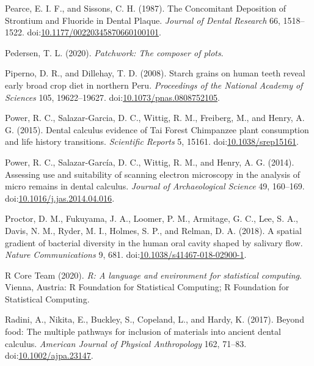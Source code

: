 \documentclass[utf8]{frontiers/frontiersSCNS}
\newlength{\cslhangindent}
\newlength{\cslentryspacingunit} %
\newenvironment{CSLReferences}[2] %
 {%
  \setlength{\parindent}{0pt}
  \ifodd #1
  \let\oldpar\par
  \def\par{\hangindent=\cslhangindent\oldpar}
  \fi
  \setlength{\parskip}{#2\cslentryspacingunit}
 }%
 {}
\begin{document}
\begin{CSLReferences}{1}{0}
\leavevmode{}%
Pearce, E. I. F., and Sissons, C. H. (1987). The {Concomitant Deposition} of {Strontium} and {Fluoride} in {Dental Plaque}. \emph{Journal of Dental Research} 66, 1518--1522. doi:\href{https://doi.org/10.1177/00220345870660100101}{10.1177/00220345870660100101}.

\leavevmode{}%
Pedersen, T. L. (2020). \emph{Patchwork: {The} composer of plots}.

\leavevmode{}%
Piperno, D. R., and Dillehay, T. D. (2008). Starch grains on human teeth reveal early broad crop diet in northern {Peru}. \emph{Proceedings of the National Academy of Sciences} 105, 19622--19627. doi:\href{https://doi.org/10.1073/pnas.0808752105}{10.1073/pnas.0808752105}.

\leavevmode{}%
Power, R. C., Salazar-Garcia, D. C., Wittig, R. M., Freiberg, M., and Henry, A. G. (2015). Dental calculus evidence of {Tai Forest Chimpanzee} plant consumption and life history transitions. \emph{Scientific Reports} 5, 15161. doi:\href{https://doi.org/10.1038/srep15161}{10.1038/srep15161}.

\leavevmode{}%
Power, R. C., Salazar-García, D. C., Wittig, R. M., and Henry, A. G. (2014). Assessing use and suitability of scanning electron microscopy in the analysis of micro remains in dental calculus. \emph{Journal of Archaeological Science} 49, 160--169. doi:\href{https://doi.org/10.1016/j.jas.2014.04.016}{10.1016/j.jas.2014.04.016}.

\leavevmode{}%
Proctor, D. M., Fukuyama, J. A., Loomer, P. M., Armitage, G. C., Lee, S. A., Davis, N. M., Ryder, M. I., Holmes, S. P., and Relman, D. A. (2018). A spatial gradient of bacterial diversity in the human oral cavity shaped by salivary flow. \emph{Nature Communications} 9, 681. doi:\href{https://doi.org/10.1038/s41467-018-02900-1}{10.1038/s41467-018-02900-1}.

\leavevmode{}%
R Core Team (2020). \emph{R: {A} language and environment for statistical computing}. {Vienna, Austria}: {R Foundation for Statistical Computing}; {R Foundation for Statistical Computing}.

\leavevmode{}%
Radini, A., Nikita, E., Buckley, S., Copeland, L., and Hardy, K. (2017). Beyond food: {The} multiple pathways for inclusion of materials into ancient dental calculus. \emph{American Journal of Physical Anthropology} 162, 71--83. doi:\href{https://doi.org/10.1002/ajpa.23147}{10.1002/ajpa.23147}.


\end{CSLReferences}
\end{document}
